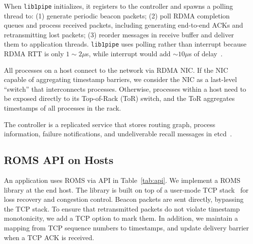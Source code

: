 When \texttt{lib1pipe} initializes, it registers to the controller and spawns a polling thread to: (1) generate periodic beacon packets; (2) poll RDMA completion queues and process received packets, including generating end-to-end ACKs and retransmitting lost packets; (3) reorder messages in receive buffer and deliver them to application threads.
\texttt{lib1pipe} uses polling rather than interrupt because RDMA RTT is only $1\sim2 \mu$s, while interrupt would add $\sim10 \mu$s of delay~\cite{yang2012poll}.

All processes on a host connect to the network via RDMA NIC. If the NIC capable of aggregating timestamp barriers, we consider the NIC as a last-level ``switch'' that interconnects processes. Otherwise, processes within a host need to be exposed directly to its Top-of-Rack (ToR) switch, and the ToR aggregates timestamps of all processes in the rack.

The controller is a replicated service that stores routing graph, process information, failure notifications, and undeliverable recall messages in etcd~\cite{etcd}.




\iffalse
\subsection{ROMS API on Hosts}
\label{sec:api}

An application uses ROMS via API in Table~\ref{tab:api}.
We implement a ROMS library at the end host. The library is built on top of a user-mode TCP stack~\cite{libvma,dunkels2001design} for loss recovery and congestion control. Beacon packets are sent directly, bypassing the TCP stack. To ensure that retransmitted packets do not violate timestamp monotonicity, we add a TCP option to mark them. In addition, we maintain a mapping from TCP sequence numbers to timestamps, and update delivery barrier when a TCP ACK is received.

